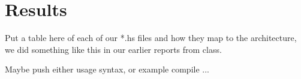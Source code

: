 \section{Results}

Put a table here of each of our *.hs files and how they map
to the architecture, we did something like this in our earlier
reports from class.

Maybe push either usage syntax, or example compile ...
